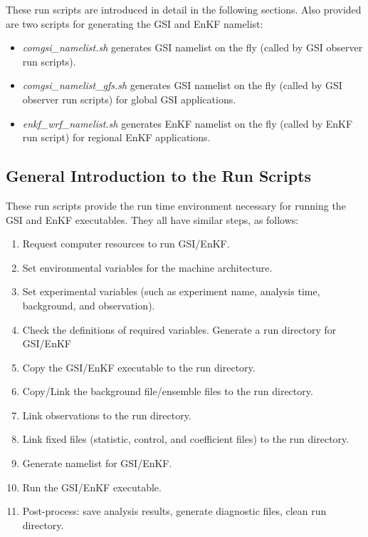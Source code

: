 These run scripts are introduced in detail in the following sections. Also provided are two scripts for generating the GSI and EnKF namelist:
\begin{itemize}
\item \textit{comgsi\_namelist.sh} generates GSI namelist on the fly (called by GSI observer run scripts).
\item \textit{comgsi\_namelist\_gfs.sh} generates GSI namelist on the fly (called by GSI observer run scripts) for global GSI applications. 
\item \textit{enkf\_wrf\_namelist.sh} generates EnKF namelist on the fly (called by EnKF run script) for regional EnKF applications.
\end{itemize}

 \subsection{General Introduction to the Run Scripts}

These run scripts provide the run time environment necessary for running the GSI and EnKF executables. They all have similar steps, as follows:
\begin{enumerate}
\item Request computer resources to run GSI/EnKF.
\item Set environmental variables for the machine architecture.
\item Set experimental variables (such as experiment name, analysis time, background, and observation).
\item Check the definitions of required variables. 
Generate a run directory for GSI/EnKF
\item Copy the GSI/EnKF executable to the run directory.
\item Copy/Link the background file/ensemble files to the run directory.
\item Link observations to the run directory.
\item Link fixed files (statistic, control, and coefficient files) to the run directory.
\item  Generate namelist for GSI/EnKF.
\item Run the GSI/EnKF executable.
\item Post-process: save analysis results, generate diagnostic files, clean run directory.
\end{enumerate}

